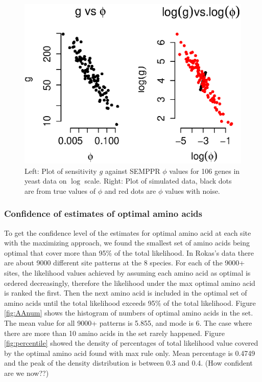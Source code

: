 \begin{figure}[h]
\centering
\includegraphics[scale=1]{g_vs_phi.eps}
\caption{Left: Plot of sensitivity $g$ against SEMPPR $\phi$ values for 106 genes in yeast data on $\log$ scale. Right: Plot of simulated data, black dots are from true values of $\phi$ and red dots are $\phi$ values with noise.}
\label{fig:gvsphi}
\end{figure}

\subsubsection{Confidence of estimates of optimal amino acids}
To get the confidence level of the estimates for optimal amino acid at each site with the maximizing approach, we found the smallest set of amino acids being optimal that cover more than 95\% of the total likelihood.
In Rokas's data there are about 9000 different site patterns at the 8 species.
For each of the 9000+ sites, the likelihood values achieved by assuming each amino acid as optimal is ordered decreasingly, therefore the likelihood under the max optimal amino acid is ranked the first.
Then the next amino acid is included in the optimal set of amino acids until the total likelihood exceeds 95\% of the total likelihood.
Figure \ref{fig:AAnum} shows the histogram of numbers of optimal amino acids in the set.
The mean value for all 9000+ patterns is 5.855, and mode is 6.
The case where there are more than 10 amino acids in the set rarely happened.
Figure \ref{fig:percentile} showed the density of percentages of total likelihood value covered by the optimal amino acid found with max rule only.
Mean percentage is 0.4749 and the peak of the density distribution is between 0.3 and 0.4. (How confident are we now??)

